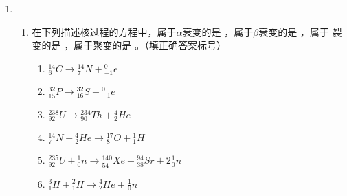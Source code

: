 \begin{enumerate}
\begin{enumerate}
\begin{enumerate}
\end{enumerate}


	
\end{enumerate}




\item 
{}
\begin{enumerate}
	\item
在下列描述核过程的方程中，属于$ \alpha $衰变的是 \underlinegap ，属于$ \beta $衰变的是 \underlinegap ，属于
裂变的是 \underlinegap ，属于聚变的是 \underlinegap 。（填正确答案标号）


\begin{multicols}{2}       
	\begin{enumerate}
		\renewcommand{\labelenumiii}{\Alph{enumiii}.}
		\item
		${ }_{6}^{14} C \rightarrow{ }_{7}^{14} N+{ }_{-1}^{0} e$
		\item 
		${ }_{15}^{32} P \rightarrow{ }_{16}^{32} S+{ }_{-1}^{0} e$
		\item 
		${ }_{92}^{238} U \rightarrow{ }_{90}^{234} T h+{ }_{2}^{4} H e$
		\item 
		${ }_{7}^{14} N+{ }_{2}^{4} He \rightarrow{ }_{8}^{17} O+{ }_{1}^{1} H$
		\item 
		${ }_{92}^{235} U+{ }_{0}^{1} n \rightarrow{ }_{54}^{140} Xe+{ }_{38}^{94} Sr+2 \frac{1}{0} n$
		\item 
		${ }_{1}^{3} H+{ }_{1}^{2} H \rightarrow{ }_{2}^{4} H e+\frac{1}{0} n$
	\end{enumerate}
\end{multicols}




\end{enumerate}
\end{enumerate}
